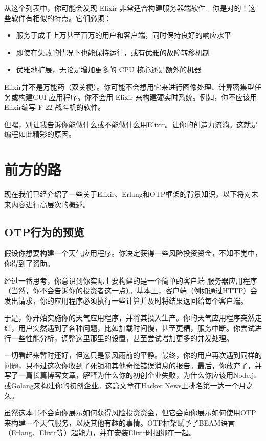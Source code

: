 从这个列表中，你可能会发现 Elixir 非常适合构建服务器端软件 - 你是对的！这些软件有相似的特点。它们必须：

\begin{itemize}

\item  服务于成千上万甚至百万的用户和客户端，同时保持良好的响应水平
\item  即使在失败的情况下也能保持运行，或有优雅的故障转移机制
\item  优雅地扩展，无论是增加更多的 CPU 核心还是额外的机器
\end{itemize}

Elixir并不是万能药（双关梗）。你可能不会想用它来进行图像处理、计算密集型任务或构建GUI 应用程序。你不会用 Elixir 来构建硬实时系统。例如，你不应该用 Elixir编写 F-22 战斗机的软件。

但嘿，别让我告诉你能做什么或不能做什么用Elixir。让你的创造力流淌。这就是编程如此精彩的原因。

\section{前方的路}

现在我们已经介绍了一些关于Elixir、Erlang和OTP框架的背景知识，以下将对未来内容进行高层次的概述。

\subsection{OTP行为的预览}

假设你想要构建一个天气应用程序。你决定获得一些风险投资资金，不知不觉中，你得到了资助。

经过一番思考，你意识到你实际上要构建的是一个简单的客户端-服务器应用程序（当然，你不会告诉你的投资者这一点）。基本上，客户端（例如通过HTTP）会发出请求，你的应用程序必须执行一些计算并及时将结果返回给每个客户端。

于是，你开始实施你的天气应用程序，并将其投入生产。你的天气应用程序突然走红，用户突然遇到了各种问题，比如加载时间慢，甚至更糟，服务中断。你尝试进行一些性能分析，调整这里那里的设置，甚至尝试增加更多的并发处理。

一切看起来暂时还好，但这只是暴风雨前的平静。最终，你的用户再次遇到同样的问题，只不过这次你收到了死锁和其他奇怪错误消息的报告。最后，你放弃了，并写了一篇长篇博客文章，解释为什么你的初创企业失败，为什么你应该用Node.js或Golang来构建你的初创企业。这篇文章在Hacker News上排名第一达一个月之久。

虽然这本书不会向你展示如何获得风险投资资金，但它会向你展示如何使用OTP来构建一个天气服务，以及其他有趣的事情。OTP框架赋予了BEAM语言（Erlang、Elixir等）超能力，并在安装Elixir时捆绑在一起。

